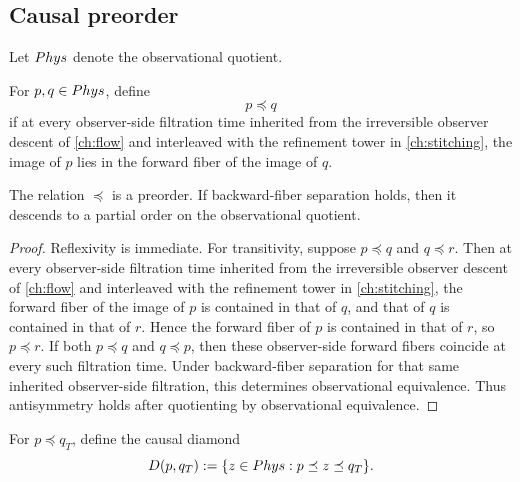 \subsection{Causal preorder}
Let \(Phys\) denote the observational quotient.
\begin{definition}
	For \(p,q\in Phys\), define
	\[
		p\preceq q
	\]
	if at every observer-side filtration time inherited from the
	irreversible observer descent of \cref{ch:flow} and interleaved
	with the refinement tower in \cref{ch:stitching}, the image of
	\(p\) lies in the forward fiber of the image of \(q\).
\end{definition}
\begin{lemma}
	The relation \(\preceq\) is a preorder.  If backward-fiber separation
	holds, then it descends to a partial order on the observational
	quotient.
\end{lemma}
\begin{proof}
	Reflexivity is immediate.
	For transitivity, suppose \(p\preceq q\) and \(q\preceq r\).  Then at
	every observer-side filtration time inherited from the irreversible
	observer descent of \cref{ch:flow} and interleaved with the
	refinement tower in \cref{ch:stitching}, the forward fiber of the
	image of \(p\) is contained in that of \(q\), and that of \(q\) is
	contained in that of \(r\).  Hence the forward fiber of \(p\) is
	contained in that of \(r\), so \(p\preceq r\).
	If both \(p\preceq q\) and \(q\preceq p\), then these observer-side
	forward fibers coincide at every such filtration time.  Under
	backward-fiber separation for that same inherited observer-side
	filtration, this determines observational equivalence.  Thus
	antisymmetry holds after quotienting by observational equivalence.
\end{proof}
For \(p\preceq q_T\), define the causal diamond
\[
	D(p,q_T):=\{z\in Phys: p\preceq z\preceq q_T\}.
\]

